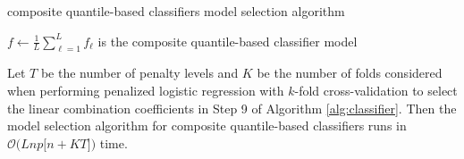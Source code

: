 \begin{algorithm}[ht]
  \caption{composite quantile-based classifiers model selection algorithm}
  \label{alg:classifier}
  \DontPrintSemicolon
  \BlankLine


  $f \leftarrow \frac{1}{L} \sum_{\ell=1}^L f_{\ell}$ is the composite
  quantile-based classifier model

\end{algorithm}


\begin{proposition}
  \label{thm:cqc-runtime}
  Let $T$ be the number of penalty levels and $K$ be the number of folds
  considered when performing penalized logistic regression with $k$-fold
  cross-validation to select the linear combination coefficients in Step 9 of
  Algorithm \ref{alg:classifier}.  Then the model selection algorithm for
  composite quantile-based classifiers runs in
  $\mathcal{O}\Big( Lnp \big[ n + KT \big]\Big)$ time.
\end{proposition}

